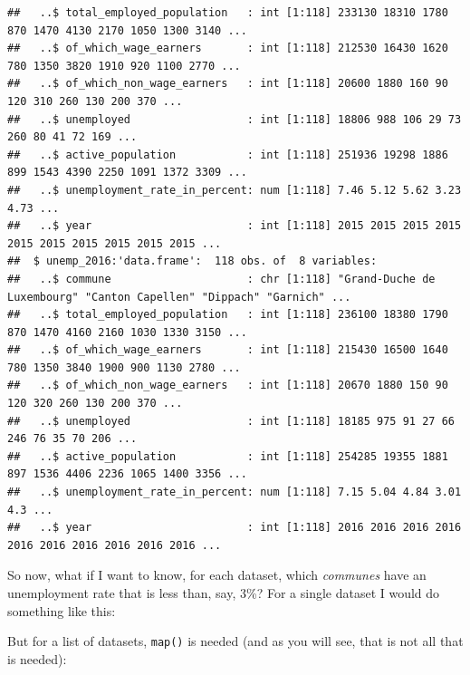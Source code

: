 \documentclass[]{gitbook}
\newenvironment{Shaded}{\begin{snugshade}}{\end{snugshade}}
\newcommand{\DecValTok}[1]{\textcolor[rgb]{0.00,0.00,0.81}{#1}}
\newcommand{\KeywordTok}[1]{\textcolor[rgb]{0.13,0.29,0.53}{\textbf{#1}}}
\newcommand{\NormalTok}[1]{#1}
\newcommand{\OperatorTok}[1]{\textcolor[rgb]{0.81,0.36,0.00}{\textbf{#1}}}
\newcommand{\StringTok}[1]{\textcolor[rgb]{0.31,0.60,0.02}{#1}}
\theoremstyle{definition}
\theoremstyle{definition}
\theoremstyle{definition}
\theoremstyle{remark}
\begin{document}
\begin{verbatim}
##   ..$ total_employed_population   : int [1:118] 233130 18310 1780 870 1470 4130 2170 1050 1300 3140 ...
##   ..$ of_which_wage_earners       : int [1:118] 212530 16430 1620 780 1350 3820 1910 920 1100 2770 ...
##   ..$ of_which_non_wage_earners   : int [1:118] 20600 1880 160 90 120 310 260 130 200 370 ...
##   ..$ unemployed                  : int [1:118] 18806 988 106 29 73 260 80 41 72 169 ...
##   ..$ active_population           : int [1:118] 251936 19298 1886 899 1543 4390 2250 1091 1372 3309 ...
##   ..$ unemployment_rate_in_percent: num [1:118] 7.46 5.12 5.62 3.23 4.73 ...
##   ..$ year                        : int [1:118] 2015 2015 2015 2015 2015 2015 2015 2015 2015 2015 ...
##  $ unemp_2016:'data.frame':  118 obs. of  8 variables:
##   ..$ commune                     : chr [1:118] "Grand-Duche de Luxembourg" "Canton Capellen" "Dippach" "Garnich" ...
##   ..$ total_employed_population   : int [1:118] 236100 18380 1790 870 1470 4160 2160 1030 1330 3150 ...
##   ..$ of_which_wage_earners       : int [1:118] 215430 16500 1640 780 1350 3840 1900 900 1130 2780 ...
##   ..$ of_which_non_wage_earners   : int [1:118] 20670 1880 150 90 120 320 260 130 200 370 ...
##   ..$ unemployed                  : int [1:118] 18185 975 91 27 66 246 76 35 70 206 ...
##   ..$ active_population           : int [1:118] 254285 19355 1881 897 1536 4406 2236 1065 1400 3356 ...
##   ..$ unemployment_rate_in_percent: num [1:118] 7.15 5.04 4.84 3.01 4.3 ...
##   ..$ year                        : int [1:118] 2016 2016 2016 2016 2016 2016 2016 2016 2016 2016 ...
\end{verbatim}

So now, what if I want to know, for each dataset, which \emph{communes}
have an unemployment rate that is less than, say, 3\%? For a single
dataset I would do something like this:

\begin{Shaded}
\end{Shaded}

But for a list of datasets, \texttt{map()} is needed (and as you will
see, that is not all that is needed):

\begin{Shaded}
\end{Shaded}
\end{document}
